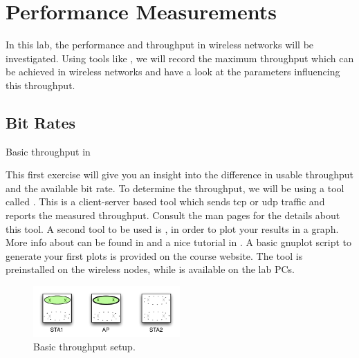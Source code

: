 \setcounter{chapter}{2}
\chapter{Performance Measurements}

In this lab, the performance and throughput in wireless networks will be investigated. Using tools like , we will record the maximum throughput which can be achieved in wireless networks and have a look at the parameters influencing this throughput. 

\section{Bit Rates}

\begin{exercise}{Basic throughput in }\label{ex:basicTput}
\label{ex:tput1}
	
	This first exercise will give you an insight into the difference in usable throughput and the available bit rate. To determine the throughput, we will be using a tool called . This is a client-server based tool which sends \ac{tcp} or \ac{udp} traffic and reports the measured throughput. Consult the man pages for the details about this tool. A second tool to be used is , in order to plot your results in a graph. More info about  can be found in \cite{gnuplotHome} and a nice tutorial in \cite{gnuplotTut}. A basic gnuplot script to generate your first plots is provided on the course website. The  tool is preinstalled on the wireless nodes, while  is available on the lab PCs.

	\begin{figure}[h!]
		\begin{center}
			\includegraphics[width=0.5\textwidth]{images/perf1.pdf}
			\caption{Basic throughput setup.} 
			\label{fig:perf1} 
		\end{center}
	\end{figure}
	

\end{exercise}
